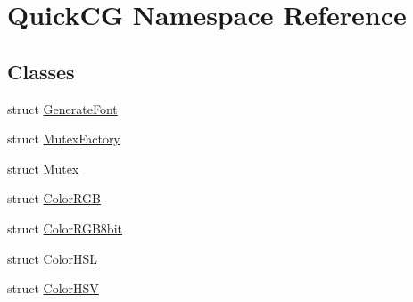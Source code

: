 \hypertarget{namespaceQuickCG}{\section{Quick\-C\-G Namespace Reference}
\label{namespaceQuickCG}
}
\subsection*{Classes}
\begin{DoxyCompactItemize}
\item 
struct \hyperlink{structQuickCG_1_1GenerateFont}{Generate\-Font}
\item 
struct \hyperlink{structQuickCG_1_1MutexFactory}{Mutex\-Factory}
\item 
struct \hyperlink{structQuickCG_1_1Mutex}{Mutex}
\item 
struct \hyperlink{structQuickCG_1_1ColorRGB}{Color\-R\-G\-B}
\item 
struct \hyperlink{structQuickCG_1_1ColorRGB8bit}{Color\-R\-G\-B8bit}
\item 
struct \hyperlink{structQuickCG_1_1ColorHSL}{Color\-H\-S\-L}
\item 
struct \hyperlink{structQuickCG_1_1ColorHSV}{Color\-H\-S\-V}
\end{DoxyCompactItemize}
